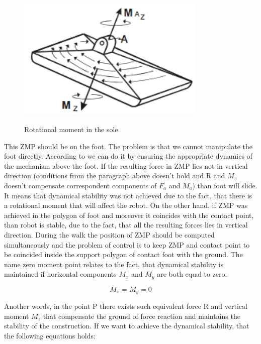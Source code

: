 \documentclass[11pt,a4paper]{article}
\begin{document}
	\begin{figure}[h!]
		\vspace{-0.2cm}
		\centering
		{\includegraphics[width=0.8\textwidth]{2}}
		\caption{Rotational moment in the sole}
		\label{fig:example2}
		\vspace{-0.1cm}
	\end{figure}

This ZMP should be on the foot. The problem is that we cannot manipulate the foot directly. According to \cite{vukobratovic2004zero} we can do it by ensuring the appropriate dynamics of the mechanism above the foot. If the resulting force in ZMP lies not in vertical direction (conditions from the paragraph above doesn't hold and R and $M_z$ doesn't compensate correspondent components of $F_a$ and $M_a$) than foot will slide. It means that dynamical stability was not achieved due to the fact, that there is a rotational moment that will affect the robot. On the other hand, if ZMP was achieved in the polygon of foot and moreover it coincides with the contact point, than robot is stable, due to the fact, that all the resulting forces lies in vertical direction. During the walk the position of ZMP should be computed simultaneously and the problem of control is to keep ZMP and contact point to be coincided inside the support polygon of contact foot with the ground.
The name zero moment point relates to the fact, that dynamical stability is maintained if horizontal components $M_x$ and $M_y$ are both equal to zero.
	
	\begin{equation}
		M_x = M_y = 0
	\end{equation}

Another words, in the point P there exists such equivalent force R and vertical moment $M_z$ that compensate the ground of force reaction and maintains the stability of the construction. If we want to achieve the dynamical stability, that the following equations holds:
\end{document}
